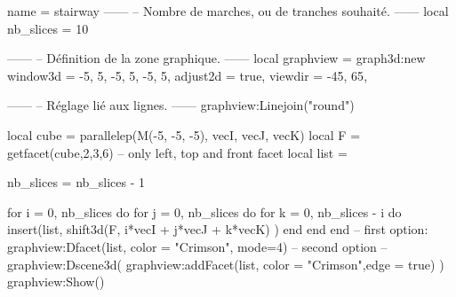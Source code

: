 \documentclass[border = 3pt]{standalone}
\begin{document}
\begin{luadraw}{name = stairway}
------
-- Nombre de marches, ou de tranches souhaité.
------
    local nb_slices = 10

------
-- Définition de la zone graphique.
------
    local graphview = graph3d:new{
        window3d = {-5, 5, -5, 5, -5, 5},
        adjust2d = true,
        viewdir  = {-45, 65},
    }

------
-- Réglage lié aux lignes.
------
    graphview:Linejoin("round")

    local cube = parallelep(M(-5, -5, -5), vecI, vecJ, vecK)
    local F = getfacet(cube,{2,3,6}) -- only left, top and front facet
    local list = {}

    nb_slices = nb_slices - 1

    for i = 0, nb_slices do
        for j = 0, nb_slices do
            for k = 0, nb_slices - i do
                insert(list, shift3d(F, i*vecI + j*vecJ + k*vecK) )
            end
        end
    end
    -- first option:
    graphview:Dfacet(list, {color = "Crimson", mode=4})
    -- second option
    --graphview:Dscene3d( graphview:addFacet(list, {color = "Crimson",edge = true}) )
    graphview:Show()

\end{luadraw}
\end{document}
